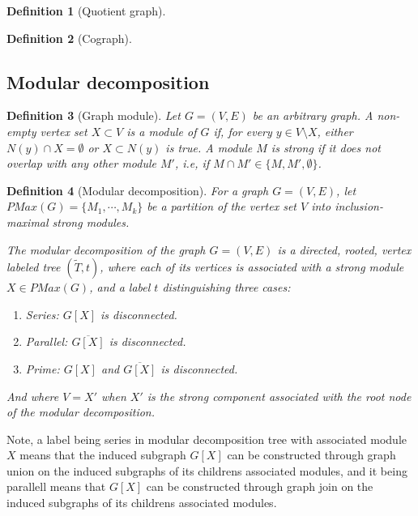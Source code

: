 \documentclass{amsart}
\newtheorem{definition}{Definition}[section]
\begin{document}
\begin{definition}[Quotient graph]

\end{definition}

\begin{definition}[Cograph]

\end{definition}

\subsection{Modular decomposition}

\begin{definition}[Graph module]
    Let $G = (V,E)$ be an arbitrary graph. A non-empty vertex set $X \subset V$
    is a \textit{module} of $G$ if, for every $y \in V \setminus X$,  either
    $N(y) \cap X = \emptyset$ or $X \subset N(y)$ is true. A module $M$ is
    \textit{strong} if it does not overlap with any other module $M'$, i.e, if 
    $M \cap M' \in \{M,M',\emptyset \}$.
\end{definition}
   
\newpage
\begin{definition}[Modular decomposition]
    For a graph $G = (V,E)$, let $PMax(G) = \{M_1,\cdots,M_k\}$ be a partition of the vertex set $V$ 
    into inclusion-maximal strong modules.
    
    The modular decomposition of the graph $G = (V,E)$ is a directed, rooted, vertex labeled tree
    $(\widetilde{T},t)$, where each of its vertices is associated with a strong
    module $X \in PMax(G)$, and a label $t$ distinguishing  three cases:

    \begin{enumerate}
        \item Series: $G[X]$ is disconnected.
        \item Parallel: $\overline{G[X]}$ is disconnected.
        \item Prime: $G[X]$ and $\overline{G[X]}$ is disconnected.
    \end{enumerate}

    And where $V = X'$ when $X'$ is the strong component associated with the
    root node of the modular decomposition.
\end{definition}

Note, a label being series in modular decomposition tree with associated module
$X$ means that the induced subgraph $G[X]$ can be constructed through graph
union on the induced subgraphs of its childrens associated modules, and it being
parallell means that $G[X]$ can be constructed through graph join on the
induced subgraphs of its childrens associated modules.
\end{document}
